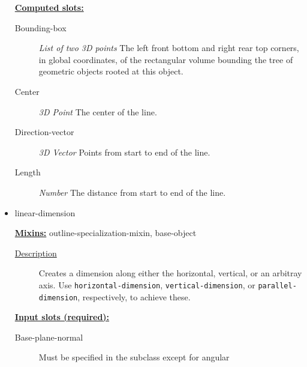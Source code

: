 \documentclass [11pt]{book}
\begin{document}
\begin{itemize}
\textbf{
\underline{Computed slots:}}

\begin{description}

\item [Bounding-box]
\emph{List of two 3D points} The left front bottom and right rear top corners, in global coordinates,
of the rectangular volume bounding the tree of geometric objects rooted at this object.


\item [Center]
\emph{3D Point} The center of the line.


\item [Direction-vector]
\emph{3D Vector} Points from start to end of the line.


\item [Length]
\emph{Number} The distance from start to end of the line.


\end{description}







\item {}linear-dimension


\textbf{
\underline{Mixins:}} outline-specialization-mixin, base-object





\begin{description}

\item [
\underline{Description}]


Creates a dimension along either the horizontal, vertical, or an arbitray axis. Use
\texttt{horizontal-dimension}, \texttt{vertical-dimension}, or \texttt{parallel-dimension}, respectively, to achieve these.



\end{description}








\textbf{
\underline{Input slots (required):}}

\begin{description}

\item [Base-plane-normal]
Must be specified in the subclass except for angular



\end{description}
\end{itemize}
\end{document}

